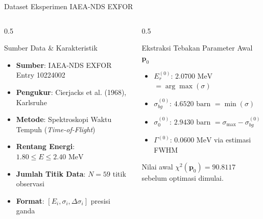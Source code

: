 \documentclass[aspectratio=169, 10pt]{beamer}
\begin{document}
\begin{frame}{Dataset Eksperimen IAEA-NDS EXFOR}
	\begin{columns}[T]
		\begin{column}{0.5\textwidth}
			\begin{block}{Sumber Data \& Karakteristik}
				\small
				\begin{itemize}
					\item \textbf{Sumber}: IAEA-NDS EXFOR Entry 10224002
					\item \textbf{Pengukur}: Cierjacks et al. (1968), Karlsruhe
					\item \textbf{Metode}: Spektroskopi Waktu Tempuh (\textit{Time-of-Flight})
					\item \textbf{Rentang Energi}: $1.80 \le E \le 2.40\text{ MeV}$
					\item \textbf{Jumlah Titik Data}: $N = 59$ titik observasi
					\item \textbf{Format}: $[E_i, \sigma_i, \Delta\sigma_i]$ presisi ganda
				\end{itemize}
			\end{block}
		\end{column}

		\begin{column}{0.5\textwidth}
			\begin{exampleblock}{Ekstraksi Tebakan Parameter Awal $\mathbf{p}_0$}
				\small
				\begin{itemize}
					\item \textbf{$E_r^{(0)}$}: $2.0700\text{ MeV}$ $= \arg\max(\sigma)$
					\item \textbf{$\sigma_{bg}^{(0)}$}: $4.6520\text{ barn}$ $= \min(\sigma)$
					\item \textbf{$\sigma_0^{(0)}$}: $2.9430\text{ barn}$ $= \sigma_{\max} - \sigma_{bg}^{(0)}$
					\item \textbf{$\Gamma^{(0)}$}: $0.0600\text{ MeV}$ via estimasi FWHM
				\end{itemize}
				\vspace{0.2cm}
				\footnotesize
				Nilai awal $\chi^2(\mathbf{p}_0) = 90.8117$ sebelum optimasi dimulai.
			\end{exampleblock}
		\end{column}
	\end{columns}
\end{frame}


\end{document}
